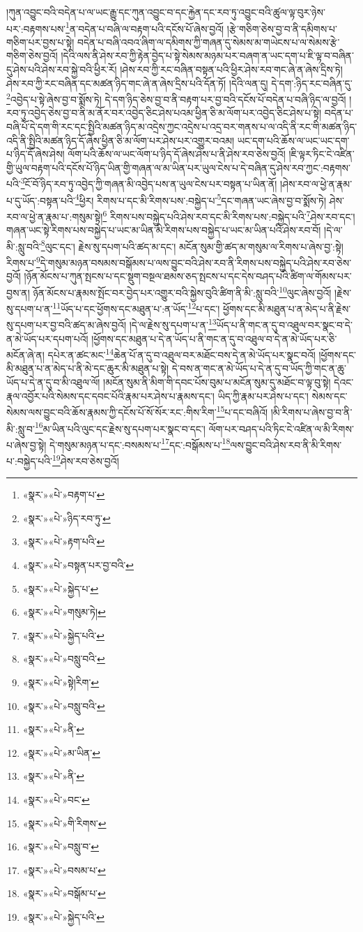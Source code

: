 །ཀུན་འབྱུང་བའི་བདེན་པ་ལ་ཡང་རྒྱུ་དང་ཀུན་འབྱུང་བ་དང་རྐྱེན་དང་རབ་ཏུ་འབྱུང་བའི་ཚུལ་ལྟ་བུར་ཉེས་པར་:བརྟགས་པས་\footnote{«སྣར་»«པེ་»བརྟག་པ་}ན་བདེན་པ་བཞི་ལ་བརྟག་པའི་དངོས་པོ་ཞེས་བྱའོ། །རྩེ་གཅིག་ཅེས་བྱ་བ་ནི་དམིགས་པ་གཅིག་པར་བྱས་པ་སྟེ། བདེན་པ་བཞི་འབའ་ཞིག་ལ་དམིགས་ཀྱི་གཞན་དུ་སེམས་མ་གཡེངས་པ་ལ་སེམས་རྩེ་གཅིག་ཅེས་བྱའོ། །དེའི་ལས་ནི་ཤེས་རབ་ཀྱི་རྟེན་བྱེད་པ་སྟེ་སེམས་མཉམ་པར་བཞག་ན་ཡང་དག་པ་ཇི་ལྟ་བ་བཞིན་དུ་ཤེས་པའི་ཤེས་རབ་སྐྱེ་བའི་ཕྱིར་རོ། །ཤེས་རབ་ཀྱི་རང་བཞིན་བསྟན་པའི་ཕྱིར་ཤེས་རབ་གང་ཞེ་ན་ཞེས་དྲིས་ཏེ། ཤེས་རབ་ཀྱི་རང་བཞིན་དང་མཚན་ཉིད་གང་ཞེ་ན་ཞེས་དྲིས་པའི་དོན་ཏོ། །དེའི་ལན་དུ། དེ་དག་:ཉིད་རང་བཞིན་དུ་\footnote{«སྣར་»«པེ་»ཉིད་རབ་ཏུ་}འབྱེད་པ་སྟེ་ཞེས་བྱ་བ་སྨོས་ཏེ། དེ་དག་ཉིད་ཅེས་བྱ་བ་ནི་བརྟག་པར་བྱ་བའི་དངོས་པོ་བདེན་པ་བཞི་ཉིད་ལ་བྱའོ། །རབ་ཏུ་འབྱེད་ཅེས་བྱ་བ་ནི་མ་ནོར་བར་འབྱེད་ཅིང་ཤེས་པའམ་ཕྱིན་ཅི་མ་ལོག་པར་འབྱེད་ཅིང་ཤེས་པ་སྟེ། བདེན་པ་བཞི་པོ་དེ་དག་གི་རང་དང་སྤྱིའི་མཚན་ཉིད་མ་འདྲེས་ཀྱང་འདྲེས་པ་འདྲ་བར་གནས་པ་ལ་འདི་ནི་རང་གི་མཚན་ཉིད་འདི་ནི་སྤྱིའི་མཚན་ཉིད་དོ་ཞེས་ཕྱིན་ཅི་མ་ལོག་པར་ཤེས་པར་འགྱུར་བའམ། ཡང་དག་པའི་ཆོས་ལ་ཡང་ཡང་དག་པ་ཉིད་དོ་ཞེས་ཤེས། ལོག་པའི་ཆོས་ལ་ཡང་ལོག་པ་ཉིད་དོ་ཞེས་ཤེས་པ་ནི་ཤེས་རབ་ཅེས་བྱའོ། །ཇི་ལྟར་ཏིང་ངེ་འཛིན་གྱི་ཡུལ་བརྟག་པའི་དངོས་པོ་ཉིད་ཡིན་གྱི་གཞན་ལ་མ་ཡིན་པར་ཡུལ་ངེས་པ་དེ་བཞིན་དུ་ཤེས་རབ་ཀྱང་:བརྟགས་པའི་\footnote{«སྣར་»«པེ་»རྟག་པའི་}ངོ་བོ་ཉིད་རབ་ཏུ་འབྱེད་ཀྱི་གཞན་མི་འབྱེད་པས་ན་ཡུལ་ངེས་པར་བསྟན་པ་ཡིན་ནོ། །ཤེས་རབ་ལ་ཕྱེ་ན་རྣམ་པ་དུ་ཡོད་:བསྟན་པའི་\footnote{«སྣར་»«པེ་»བསྟན་པར་བྱ་བའི་}ཕྱིར། རིགས་པ་དང་མི་རིགས་པས་:བསྐྱེད་པ་\footnote{«སྣར་»«པེ་»སྐྱེད་པ་}དང་གཞན་ཡང་ཞེས་བྱ་བ་སྨོས་ཏེ། ཤེས་རབ་ལ་ཕྱེ་ན་རྣམ་པ་:གསུམ་སྟེ།\footnote{«སྣར་»«པེ་»གསུམ་ཏེ།} རིགས་པས་བསྐྱེད་པའི་ཤེས་རབ་དང་མི་རིགས་པས་:བསྐྱེད་པའི་\footnote{«སྣར་»«པེ་»སྐྱེད་པའི་}ཤེས་རབ་དང་། གཞན་ཡང་སྟེ་རིགས་པས་བསྐྱེད་པ་ཡང་མ་ཡིན་མི་རིགས་པས་བསྐྱེད་པ་ཡང་མ་ཡིན་པའི་ཤེས་རབ་བོ། །དེ་ལ་མི་:སླུ་བའི་\footnote{«སྣར་»«པེ་»བསླུ་བའི་}ལུང་དང་། རྗེས་སུ་དཔག་པའི་ཚད་མ་དང་། མངོན་སུམ་གྱི་ཚད་མ་གསུམ་ལ་རིགས་པ་ཞེས་བྱ་:སྟེ། རིགས་པ་\footnote{«སྣར་»«པེ་»སྟེ།རིག་}དེ་གསུམ་མཉན་བསམས་བསྒོམས་པ་ལས་བྱུང་བའི་ཤེས་རབ་ནི་རིགས་པས་བསྐྱེད་པའི་ཤེས་རབ་ཅེས་བྱའོ། །ཉོན་མོངས་པ་ཀུན་སྤངས་པ་དང་སྡུག་བསྔལ་ཐམས་ཅད་སྤངས་པ་དང་དེས་བཤད་པའི་ཚིག་ལ་གོམས་པར་བྱས་ན། ཉོན་མོངས་པ་རྣམས་སྤོང་བར་བྱེད་པར་འགྱུར་བའི་སྐྱེས་བུའི་ཚིག་ནི་མི་:སླུ་བའི་\footnote{«སྣར་»«པེ་»བསླུ་བའི་}ལུང་ཞེས་བྱའོ། །རྗེས་སུ་དཔག་པ་ན་\footnote{«སྣར་»«པེ་»ནི་}ཡོད་པ་དང་ཕྱོགས་དང་མཐུན་པ་:ན་ཡོད་\footnote{«སྣར་»«པེ་»མ་ཡིན་}པ་དང་། ཕྱོགས་དང་མི་མཐུན་པ་ན་མེད་པ་ནི་རྗེས་སུ་དཔག་པར་བྱ་བའི་ཚད་མ་ཞེས་བྱའོ། །དེ་ལ་རྗེས་སུ་དཔག་པ་ན་\footnote{«སྣར་»«པེ་»ནི་}ཡོད་པ་ནི་གང་ན་དུ་བ་འཐུལ་བར་སྣང་བ་དེ་ན་མེ་ཡོད་པར་དཔག་པའོ། །ཕྱོགས་དང་མཐུན་པ་དེ་ན་ཡོད་པ་ནི་གང་ན་དུ་བ་འཐུལ་བ་དེ་ན་མེ་ཡོད་པར་ཅི་མངོན་ཞེ་ན། དཔེར་ན་ཚང་མང་\footnote{«སྣར་»«པེ་»བང་}ཆེན་པོ་ན་དུ་བ་འཐུལ་བར་མཐོང་བས་དེ་ན་མེ་ཡོད་པར་སྣང་བའོ། །ཕྱོགས་དང་མི་མཐུན་པ་ན་མེད་པ་ནི་མེ་དང་ཆུར་མི་མཐུན་པ་སྟེ། དེ་བས་ན་གང་ན་མེ་ཡོད་པ་དེ་ན་དུ་བ་ཡོད་ཀྱི་གང་ན་ཆུ་ཡོད་པ་དེ་ན་དུ་བ་མི་འཐུལ་ལོ། །མངོན་སུམ་ནི་མིག་གི་དབང་པོས་བུམ་པ་མངོན་སུམ་དུ་མཐོང་བ་ལྟ་བུ་སྟེ། དེའང་རྣལ་འབྱོར་པའི་སེམས་དང་དབང་པོའི་རྣམ་པར་ཤེས་པ་རྣམས་དང་། ཡིད་ཀྱི་རྣམ་པར་ཤེས་པ་དང་། སེམས་དང་སེམས་ལས་བྱུང་བའི་ཆོས་རྣམས་ཀྱི་དངོས་པོ་སོ་སོར་རང་:གིས་རིག་\footnote{«སྣར་»«པེ་»གི་རིགས་}པ་དང་བཞིའོ། །མི་རིགས་པ་ཞེས་བྱ་བ་ནི་མི་:སླུ་བ་\footnote{«སྣར་»«པེ་»བསླུ་བ་}མ་ཡིན་པའི་ལུང་དང་རྗེས་སུ་དཔག་པར་སྣང་བ་དང་། ལོག་པར་བཤད་པའི་ཏིང་ངེ་འཛིན་ལ་མི་རིགས་པ་ཞེས་བྱ་སྟེ། དེ་གསུམ་མཉན་པ་དང་:བསམས་པ་\footnote{«སྣར་»«པེ་»བསམ་པ་}དང་:བསྒོམས་པ་\footnote{«སྣར་»«པེ་»བསྒོམ་པ་}ལས་བྱུང་བའི་ཤེས་རབ་ནི་མི་རིགས་པ་:བསྐྱེད་པའི་\footnote{«སྣར་»«པེ་»སྐྱེད་པའི་}ཤེས་རབ་ཅེས་བྱའོ། 